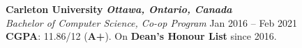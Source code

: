 \hspace{-3mm}\textbf{Carleton University}
\hfill \textit{\textbf{Ottawa, Ontario, Canada}} \\ 
\textit{Bachelor of Computer Science, Co-op Program} \hfill Jan 2016 -- Feb 2021 \\ \textbf{CGPA}: 11.86/12 (\textbf{A+}). On \textbf{Dean's Honour List} since 2016.
